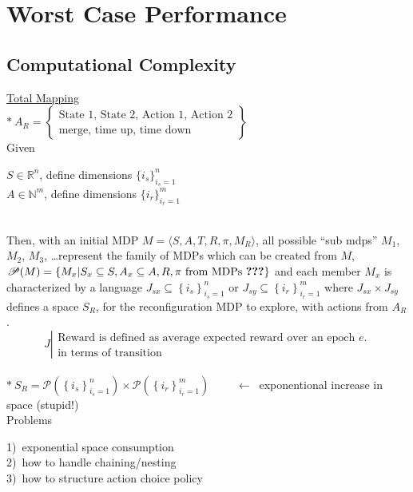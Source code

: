 \section{Worst Case Performance}
\label{sec:worstcase}

\subsection{Computational Complexity}
 \label{sec:complexity}

\underline{Total Mapping}\\

 
$\ast\ A_R = \left\{ \begin{array}{l} \text{State 1, State 2, Action 1, Action 2} \\ \text{merge, time up, time down} \end{array} \right\}$\\

Given\ 
\begin{minipage}[t]{0.7\textwidth}
$S\in\mathbb{R}^{n}$, define dimensions $\{i_s\}_{i_s=1}^{n}$ \\
$A\in \mathbb{N}^{m}$, define dimensions $\{i_r\}_{i_r=1}^{m}$
\end{minipage}\\

Then, with an initial MDP $M=\langle S, A, T, R, \pi, M_R \rangle$, all possible ``sub mdps'' $M_1$, $M_2$, $M_3$, \ldots represent the family of MDPs which can be created from $M$, $\mathscr{P}(M)=\left\{M_x | S_x \subseteq S, A_x\subseteq A, R, \pi \text{\ from MDPs \textbf{???}}\right\}$ and each member $M_x$ is characterized by a language $J_{sx}\subseteq \left\{i_s\right\}_{i_s=1}^{n}$ or $J_{sy}\subseteq\left\{i_r\right\}_{i_r=1}^{m}$ where $J_{sx}\times J_{sy}$ defines a space $S_R$, for the reconfiguration MDP to explore, with actions from $A_R$.\\

\begin{equation*}
J \left| \begin{array}{l}\text{Reward is defined as average expected reward over an epoch $e$.} \\ \text{in terms of transition} \end{array} \right.
\end{equation*}\\

$\ast\ S_R = \mathscr{P}\left(\left\{i_s\right\}_{i_s=1}^{n}\right)\times\mathscr{P}\left(\left\{i_r\right\}_{i_r=1}^{m}\right)$
$\qquad\longleftarrow\ $ exponentional increase in space (stupid!)
\\

Problems\ 
\begin{minipage}[t]{0.5\textwidth}
1)\ exponential space consumption\\
2)\ how to handle chaining/nesting\\
3)\ how to structure action choice policy
\end{minipage}